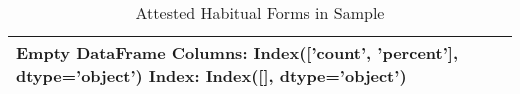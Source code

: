 \begin{table}[htbp!]
\centering
\caption{Attested Habitual Forms in Sample}
\label{table:hab_front}
\begin{tabular}{lrl}
\toprule
Empty DataFrame
Columns: Index(['count', 'percent'], dtype='object')
Index: Index([], dtype='object') \\
\bottomrule
\end{tabular}
\end{table}
